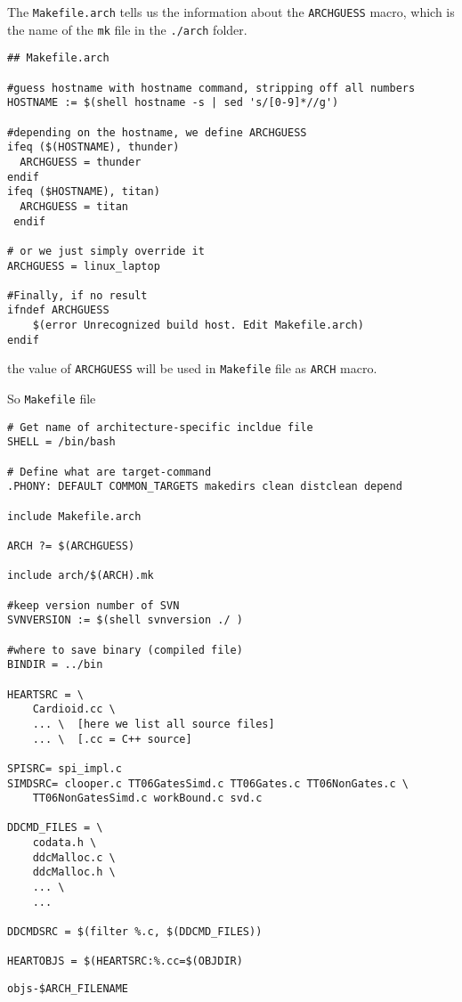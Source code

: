 The \verb!Makefile.arch! tells us the information about the \verb!ARCHGUESS!
macro, which is the name of the \verb!mk! file in the \verb!./arch! folder.
\begin{verbatim}
## Makefile.arch

#guess hostname with hostname command, stripping off all numbers
HOSTNAME := $(shell hostname -s | sed 's/[0-9]*//g')

#depending on the hostname, we define ARCHGUESS
ifeq ($(HOSTNAME), thunder)
  ARCHGUESS = thunder
endif
ifeq ($HOSTNAME), titan)
  ARCHGUESS = titan
 endif
 
# or we just simply override it
ARCHGUESS = linux_laptop

#Finally, if no result
ifndef ARCHGUESS
	$(error Unrecognized build host. Edit Makefile.arch)
endif
\end{verbatim}
the value of \verb!ARCHGUESS! will be used in \verb!Makefile! file as
\verb!ARCH! macro.

So \verb!Makefile! file
\begin{verbatim}
# Get name of architecture-specific incldue file 
SHELL = /bin/bash

# Define what are target-command
.PHONY: DEFAULT COMMON_TARGETS makedirs clean distclean depend

include Makefile.arch

ARCH ?= $(ARCHGUESS)

include arch/$(ARCH).mk

#keep version number of SVN
SVNVERSION := $(shell svnversion ./ )

#where to save binary (compiled file)
BINDIR = ../bin

HEARTSRC = \
	Cardioid.cc \
	... \  [here we list all source files]
	... \  [.cc = C++ source]

SPISRC= spi_impl.c
SIMDSRC= clooper.c TT06GatesSimd.c TT06Gates.c TT06NonGates.c \
	TT06NonGatesSimd.c workBound.c svd.c

DDCMD_FILES = \
	codata.h \
	ddcMalloc.c \
	ddcMalloc.h \
	... \
	...
	
DDCMDSRC = $(filter %.c, $(DDCMD_FILES))

HEARTOBJS = $(HEARTSRC:%.cc=$(OBJDIR)
\end{verbatim}


\verb!objs-$ARCH_FILENAME!

